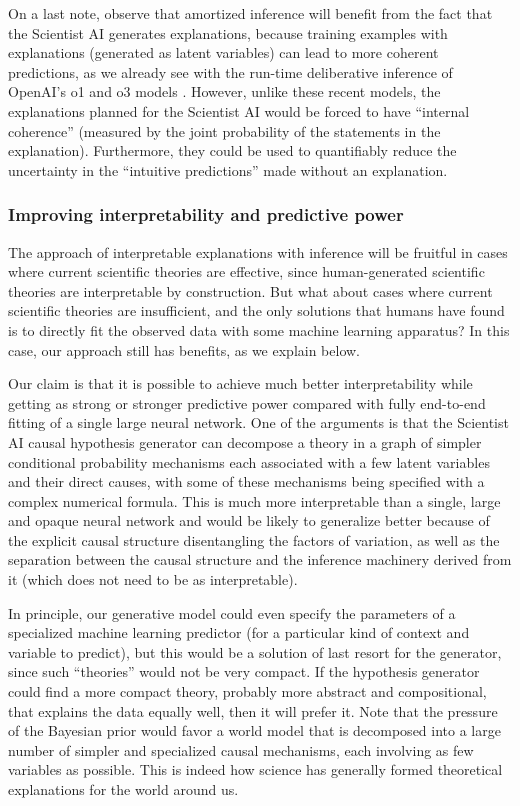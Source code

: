 On a last note, observe that amortized inference will benefit from the fact that the Scientist AI generates explanations, because training examples with explanations (generated as latent variables) can lead to more coherent predictions, as we already see with the run-time deliberative inference of OpenAI's o1 and o3 models \cite{openai.com.index.openai.o1.system.card,cdn.openai.com.o3.mini.system.card.pdf}. However, unlike these recent models, the explanations planned for the Scientist AI would be forced to have ``internal coherence'' (measured by the joint probability of the statements in the explanation). Furthermore, they could be used to quantifiably reduce the uncertainty in the ``intuitive predictions'' made without an explanation.

    \subsubsection{Improving interpretability and predictive power}

The approach of interpretable explanations with inference will be fruitful in cases where current scientific theories are effective, since human-generated scientific theories are interpretable by construction. But what about cases where current scientific theories are insufficient, and the only solutions that humans have found is to directly fit the observed data with some machine learning apparatus? In this case, our approach still has benefits, as we explain below. 

Our claim is that it is possible to achieve much better interpretability while getting as strong or stronger predictive power compared with fully end-to-end fitting of a single large neural network. One of the arguments is that the Scientist AI causal hypothesis generator can decompose a theory in a graph of simpler conditional probability mechanisms each associated with a few latent variables and their direct causes, with some of these mechanisms being specified with a complex numerical formula. This is much more interpretable than a single, large and opaque neural network and would be likely to generalize better because of the explicit causal structure disentangling the factors of variation, as well as the separation between the causal structure and the inference machinery derived from it (which does not need to be as interpretable).

In principle, our generative model could even specify the parameters of a specialized machine learning predictor (for a particular kind of context and variable to predict), but this would be a solution of last resort for the generator, since such ``theories'' would not be very compact. If the hypothesis generator could find a more compact theory, probably more abstract and compositional, that explains the data equally well, then it will prefer it. Note that the pressure of the Bayesian prior would favor a world model that is decomposed into a large number of simpler and specialized causal mechanisms, each involving as few variables as possible. This is indeed how science has generally formed theoretical explanations for the world around us. 
    
